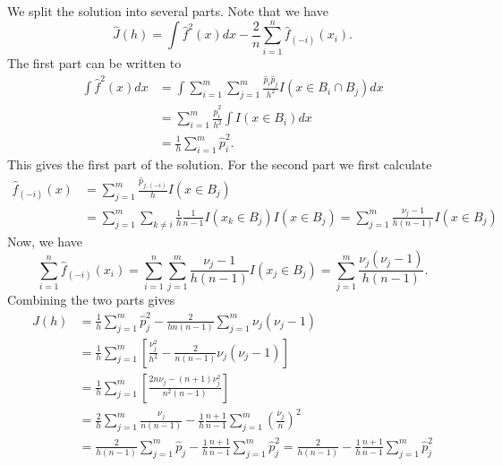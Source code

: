 We split the solution into several parts.
Note that we have
\begin{equation*}
    \hat{J}(h) = \int \hat{f}^2(x) dx - \frac{2}{n} \sum_{i = 1}^n \hat{f}_{(-i)}(x_i).
\end{equation*}
The first part can be written to
\begin{equation*}
    \begin{split}
        \int \hat{f}^2(x) dx
            &= \int \sum_{i = 1}^m \sum_{j = 1}^m \frac{\hat{p}_i \hat{p}_j}{h^2} I(x \in B_i \cap B_j) dx \\
            &= \sum_{i = 1}^m \frac{\hat{p}_i^2}{h^2} \int I(x \in B_i) dx \\
            &= \frac{1}{h} \sum_{i = 1}^m \hat{p}_i^2.
    \end{split}
\end{equation*}
This gives the first part of the solution.
For the second part we first calculate
\begin{equation*}
    \begin{split}
        \hat{f}_{(-i)}(x)
            &= \sum_{j = 1}^m \frac{\hat{p}_{j,(-i)}}{h} I(x \in B_j) \\
            &= \sum_{j = 1}^m \sum_{k \neq i} \frac{1}{h} \frac{1}{n - 1} I(x_k \in B_j) I(x \in B_j)
            = \sum_{j = 1}^m \frac{\nu_j - 1}{h(n - 1)} I(x \in B_j)
    \end{split}
\end{equation*}
Now, we have
\begin{equation*}
        \sum_{i = 1}^n \hat{f}_{(-i)}(x_i)
            = \sum_{i = 1}^n \sum_{j = 1}^m \frac{\nu_j - 1}{h(n - 1)} I(x_j \in B_j)
            = \sum_{j = 1}^m \frac{\nu_j (\nu_j - 1)}{h (n - 1)}.
\end{equation*}
Combining the two parts gives
\begin{equation*}
    \begin{split}
        \hat{J}(h) &= \frac{1}{h} \sum_{j = 1}^m \hat{p}_j^2 - \frac{2}{h n (n - 1)} \sum_{j = 1}^m \nu_j(\nu_j - 1) \\
            &= \frac{1}{h} \sum_{j = 1}^m \left[\frac{\nu_j^2}{h^2} - \frac{2}{n(n-1)} \nu_j(\nu_j - 1)\right] \\
            &= \frac{1}{h} \sum_{j = 1}^m \left[\frac{2 n \nu_j - (n + 1) \nu_j^2}{n^2 (n - 1)}\right] \\
            &= \frac{2}{h} \sum_{j = 1}^m \frac{\nu_j}{n(n-1)} - \frac{1}{h} \frac{n + 1}{n - 1} \sum_{j = 1}^m \left(\frac{\nu_j}{n}\right)^2 \\
            &= \frac{2}{h(n - 1)} \sum_{j = 1}^m \hat{p}_j - \frac{1}{h} \frac{n + 1}{n - 1} \sum_{j = 1}^m \hat{p}_j^2
            = \frac{2}{h(n - 1)} - \frac{1}{h} \frac{n + 1}{n - 1} \sum_{j = 1}^m \hat{p}_j^2
    \end{split}
\end{equation*}
